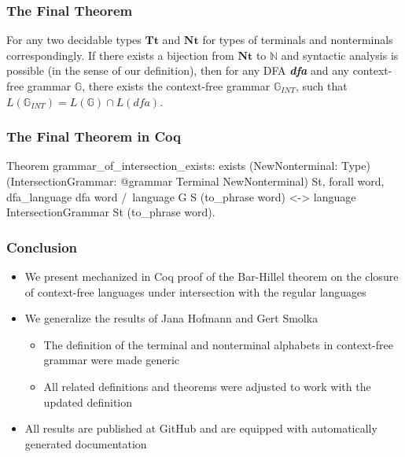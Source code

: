 \documentclass[xcolor=table]{beamer}
\begin{document}
\begin{frame}[fragile] \frametitle{The Final Theorem}

\begin{theorem}
    For any two decidable types $\textbf{Tt}$ and $\textbf{Nt}$ for types of terminals and nonterminals correspondingly. If there exists a bijection from $\textbf{Nt}$ to $\mathbb{N}$ and syntactic analysis is possible (in the sense of our definition), then for any DFA \textbf{\textit{dfa}} and any context-free grammar $\mathbb{G}$, there exists the context-free grammar $\mathbb{G}_{INT}$, such that $L(\mathbb{G}_{INT}) = L(\mathbb{G}) \cap L(\textit{dfa})$.
\end{theorem}

\end{frame}

\begin{frame}[fragile] \frametitle{The Final Theorem in Coq}

      \begin{pyglist}[language=coq, numbers=none, numbersep=5pt]

  Theorem grammar_of_intersection_exists:
    exists
     (NewNonterminal: Type)
     (IntersectionGrammar: @grammar Terminal NewNonterminal)
     St,
    forall word,
      dfa_language dfa word /\ language G S (to_phrase word)
      <->
      language IntersectionGrammar St (to_phrase word).
     \end{pyglist}

\end{frame}

\begin{frame} \frametitle{Conclusion}

\begin{itemize}
 \item We present mechanized in Coq proof of the Bar-Hillel theorem on the closure of context-free languages under intersection with the regular languages
 \pause
 \item We generalize the results of Jana Hofmann and Gert Smolka
 \begin{itemize}
   \item The definition of the terminal and nonterminal alphabets in context-free grammar were made generic
   \item All related definitions and theorems were adjusted to work with the updated definition

 \end{itemize}
 \pause
 \item All results are published at GitHub and are equipped with automatically generated documentation

\end{itemize}

\end{frame}
\end{document}
